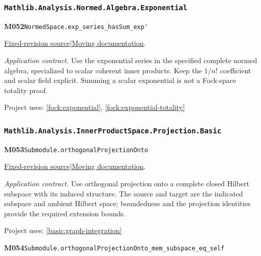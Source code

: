 \documentclass[11pt,a4paper]{article}
\theoremstyle{definition}
\theoremstyle{remark}
\begin{document}
\subsubsection*{\nolinkurl{Mathlib.Analysis.Normed.Algebra.Exponential}}
\noindent\textbf{M052}\label{base:M052}\quad\nolinkurl{NormedSpace.exp_series_hasSum_exp'}

\href{https://github.com/leanprover-community/mathlib4/blob/9bac2d0692944a775113f7c130fd5e5b4608a854/Mathlib/Analysis/Normed/Algebra/Exponential.lean}{Fixed-revision source}\quad|\quad\href{https://leanprover-community.github.io/mathlib4_docs/Mathlib/Analysis/Normed/Algebra/Exponential.html#NormedSpace.exp_series_hasSum_exp'}{Moving documentation}.\par
\noindent\textit{Application contract.} Use the exponential series in the specified complete normed algebra, specialized to scalar coherent inner products. Keep the $1/n!$ coefficient and scalar field explicit. Summing a scalar exponential is not a Fock-space totality proof.\par
{\small Project uses: \ref{fock:exponential}, \ref{fock:exponential-totality}}\par\medskip

\subsubsection*{\nolinkurl{Mathlib.Analysis.InnerProductSpace.Projection.Basic}}
\noindent\textbf{M053}\label{base:M053}\quad\nolinkurl{Submodule.orthogonalProjectionOnto}

\href{https://github.com/leanprover-community/mathlib4/blob/9bac2d0692944a775113f7c130fd5e5b4608a854/Mathlib/Analysis/InnerProductSpace/Projection/Basic.lean}{Fixed-revision source}\quad|\quad\href{https://leanprover-community.github.io/mathlib4_docs/Mathlib/Analysis/InnerProductSpace/Projection/Basic.html#Submodule.orthogonalProjectionOnto}{Moving documentation}.\par
\noindent\textit{Application contract.} Use orthogonal projection onto a complete closed Hilbert subspace with its induced structure. The source and target are the indicated subspace and ambient Hilbert space; boundedness and the projection identities provide the required extension bounds.\par
{\small Project uses: \ref{basic:graph-integration}}\par\medskip

\noindent\textbf{M054}\label{base:M054}\quad\nolinkurl{Submodule.orthogonalProjectionOnto_mem_subspace_eq_self}
\end{document}

